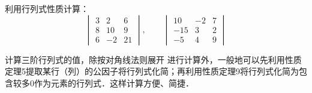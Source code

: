 \begin{example}
    利用行列式性质计算：
\[\begin{vmatrix}
    3&2&6\\
    8&10&9\\
    6&-2&21
\end{vmatrix},\qquad \begin{vmatrix}
    10&-2&7\\
    -15&3&2\\
    -5&4&9 
\end{vmatrix}\]
\end{example}

\begin{analyze}
    计算三阶行列式的值，除按对角线法则展开
    进行计算外，一般地可以先利用性质定理5提取某行（列）的公因子将行列式化简；再利用性质定理9将行列式化简为包含较多0作为元素的行列式．这样计算方便、简捷．  
\end{analyze}

